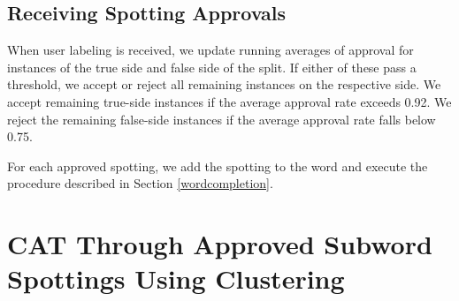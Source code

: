\documentclass[ms,electronic,twosidetoc,letterpaper,chaptercenter,parttop,lof,lot]{byumsphd}
\begin{document}
%
%

\subsection{Receiving Spotting Approvals}

When user labeling is received, we update running averages of approval for instances of the true side and false side of the split. If either of these pass a threshold, we accept or reject all remaining instances on the respective side. We accept remaining true-side instances if the average approval rate exceeds 0.92. We reject the remaining false-side instances if the average approval rate falls below 0.75.

For each approved spotting, we add the spotting to the word and execute the procedure described in Section \ref{wordcompletion}.










\section{CAT Through Approved Subword Spottings Using Clustering}
\end{document}

